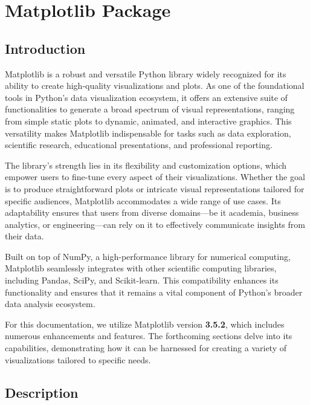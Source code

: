 %




\chapter{Matplotlib Package}

\section{Introduction}

Matplotlib is a robust and versatile Python library widely recognized for its ability to create high-quality visualizations and plots. As one of the foundational tools in Python's data visualization ecosystem, it offers an extensive suite of functionalities to generate a broad spectrum of visual representations, ranging from simple static plots to dynamic, animated, and interactive graphics. This versatility makes Matplotlib indispensable for tasks such as data exploration, scientific research, educational presentations, and professional reporting.

The library's strength lies in its flexibility and customization options, which empower users to fine-tune every aspect of their visualizations. Whether the goal is to produce straightforward plots or intricate visual representations tailored for specific audiences, Matplotlib accommodates a wide range of use cases. Its adaptability ensures that users from diverse domains—be it academia, business analytics, or engineering—can rely on it to effectively communicate insights from their data.

Built on top of NumPy, a high-performance library for numerical computing, Matplotlib seamlessly integrates with other scientific computing libraries, including Pandas, SciPy, and Scikit-learn. This compatibility enhances its functionality and ensures that it remains a vital component of Python's broader data analysis ecosystem.

For this documentation, we utilize Matplotlib version \textbf{3.5.2}, which includes numerous enhancements and features. The forthcoming sections delve into its capabilities, demonstrating how it can be harnessed for creating a variety of visualizations tailored to specific needs.


\section{Description}

